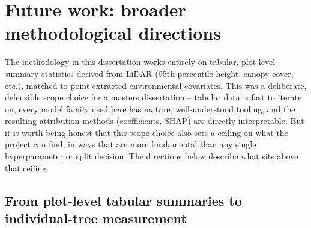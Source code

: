 %

\section{Future work: broader methodological directions}
\label{sec:futurework-broad}

The methodology in this dissertation works entirely on tabular, plot-level summary statistics
derived from LiDAR (95th-percentile height, canopy cover, etc.), matched to point-extracted
environmental covariates. This was a deliberate, defensible scope choice for a masters
dissertation -- tabular data is fast to iterate on, every model family used here has mature,
well-understood tooling, and the resulting attribution methods (coefficients, SHAP) are directly
interpretable. But it is worth being honest that this scope choice also sets a ceiling on what the
project can find, in ways that are more fundamental than any single hyperparameter or split
decision. The directions below describe what sits above that ceiling.

\subsection{From plot-level tabular summaries to individual-tree measurement}
\label{sec:futurework-imagery}

